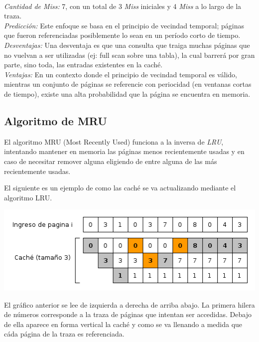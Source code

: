 \documentclass[11pt, a4paper, spanish]{article}
\begin{document}
 \\
\emph{Cantidad de Miss:} 7, con un total de 3 \emph{Miss} iniciales y 4 \emph{Miss} a lo largo de la traza.\\
\emph{Predicci\'on:} Este enfoque se basa en el principio de vecindad temporal; p\'aginas que fueron referenciadas posiblemente lo sean en un per\'iodo corto de tiempo.\\
\emph{Desventajas:} Una desventaja es que una consulta que traiga muchas p\'aginas que no vuelvan a ser utilizadas (ej: full scan sobre una tabla), la cual barrer\'a por gran parte, sino toda, las entradas existentes en la cach\'e.\\
\emph{Ventajas:} En un contexto donde el principio de vecindad temporal es v\'alido, mientras un conjunto de p\'aginas se referencie con periocidad (en ventanas cortas de tiempo), existe una alta probabilidad que la p\'agina se encuentra en memoria.\\

\newpage
\subsection{Algoritmo de MRU}

El algoritmo MRU (Most Recently Used) funciona a la inversa de \textit{LRU}, intentando mantener en memoria las p\'aginas menos recientemente usadas
y en caso de necesitar remover alguna eligiendo de entre alguna de las m\'as recientemente usadas.

El siguiente es un ejemplo de como las cach\'e se va actualizando mediante el algoritmo LRU.

\begin{center}
		\includegraphics[scale=0.65]{diagramas/MRUAlgorithm.png}\\
\end{center}

El gr\'afico anterior se lee de izquierda a derecha de arriba abajo. La primera hilera de n\'umeros corresponde a la traza de p\'aginas que intentan ser 
accedidas. Debajo de ella aparece en forma vertical la cach\'e y como se va llenando a medida que c\'ada p\'agina de la traza es referenciada.\\ 
\end{document}
